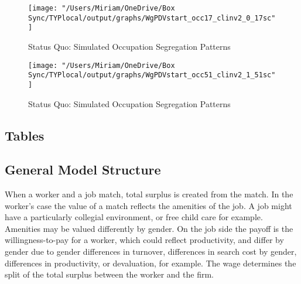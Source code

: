 \documentclass[12pt]{article}
\begin{document}
% 

\begin{figure}[H]
\centering
\caption{Status Quo: Simulated Occupation Segregation Patterns}
\label{nurses}
\texttt{[image: "/Users/Miriam/OneDrive/Box Sync/TYPlocal/output/graphs/WgPDVstart\_occ17\_clinv2\_0\_17sc"]}
\end{figure}
\begin{figure}[H]
\centering
\caption{Status Quo: Simulated Occupation Segregation Patterns}
\label{mechanics}
\texttt{[image: "/Users/Miriam/OneDrive/Box Sync/TYPlocal/output/graphs/WgPDVstart\_occ51\_clinv2\_1\_51sc"]}
\end{figure}


\newpage
\subsection{Tables}



%
%



%



%




\label{FEs}



\clearpage
\newpage

\subsection{General Model Structure}
When a worker and a job match, total surplus is created from the match. In the worker's case the value of a match reflects the amenities of the job. A job might have a particularly collegial environment, or free child care for example. Amenities may be valued differently by gender. On the job side the payoff is the willingness-to-pay for a worker, which could reflect productivity, and differ by gender due to gender differences in turnover, differences in search cost by gender, differences in productivity, or devaluation, for example. The wage determines the split of the total surplus between the worker and the firm.
\end{document}
